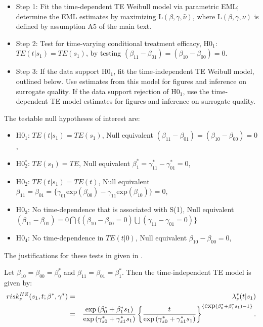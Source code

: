 \documentclass[times, 11pt]{article}
\begin{document}
\begin{itemize} 
\item Step 1: Fit the time-dependent TE Weibull model via parametric EML; determine the EML estimates by maximizing $\mbox{L}(\beta, \gamma, \widehat{\nu})$, where $\mbox{L}(\beta,\gamma,\nu)$ is defined by assumption A5 of the main text.
\item Step 2: Test for time-varying conditional treatment efficacy, H0$_1$: $TE(t|s_1) = TE(s_1)$, by testing $(\beta_{11}-\beta_{01})=(\beta_{10}-\beta_{00})=0$.
\item Step 3: If the data support H0$_1$, fit the time-independent TE Weibull model, outlined below. Use estimates from this model for figures and inference on surrogate quality. If the data support rejection of H0$_1$, use the time-dependent TE model estimates for figures and inference on surrogate quality. 
\end{itemize} 
The testable null hypotheses of interest are:
\vspace{-1mm}
\begin{itemize}
\item H0$_1$: $TE(t|s_1) = TE(s_1)$, Null equivalent $(\beta_{11}-\beta_{01})=(\beta_{10}-\beta_{00})=0$,
\item H0$^{*}_2$: $TE(s_1) = TE$, Null equivalent $\beta^{*}_{1}=\gamma^{*}_{11}-\gamma^{*}_{01}=0$,
\item H0$_2$: $TE(t|s_1) = TE(t)$, Null equivalent $\beta_{11}=\beta_{01}=\{\gamma_{01}\mbox{exp}(\beta_{00})-\gamma_{11}\mbox{exp}(\beta_{10})\}=0$,
\item H0$_3$: No time-dependence that is associated with S(1), Null equivalent\\ $(\beta_{11}-\beta_{01})=0 \bigcap \{(\beta_{10}-\beta_{00}=0) \bigcup (\gamma_{11}-\gamma_{01}=0)\}$
\item H0$_4$: No time-dependence in $TE(t|0)$, Null equivalent $\beta_{10}-\beta_{00}=0$,
\end{itemize}
The justifications for these tests in given in \citet{Gabriel13}. 

Let $\beta_{10}=\beta_{00}=\beta^{*}_{0}$ and $\beta_{11}=\beta_{01}=\beta^{*}_{1}$. Then the time-independent TE model is given by:
\begin{eqnarray*}
risk^{HZ}_{z}(s_1,t; \beta^{*}, \gamma^{*})&=&\lambda^{*}_z(t|s_1) \\
&=&{\mbox{exp}\left(\beta^{*}_{0}+\beta^{*}_{1} s_1\right) \over \mbox{exp}\left(\gamma^{*}_{z0} + \gamma^{*}_{z1} s_1  \right)}\left\{{t \over \mbox{exp}\left(\gamma^{*}_{z0} +\gamma^{*}_{z1} s_1 \right)}\right\}^{\left\{\mbox{exp}\left(\beta^{*}_{0} + \beta^{*}_{1} s_1\right) - 1\right\}}.
\end{eqnarray*}
\end{document}
